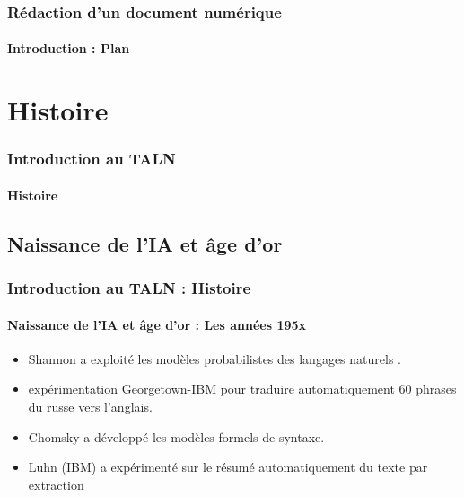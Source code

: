 \documentclass{beamer}
\begin{document}
\begin{frame}
\frametitle{Rédaction d'un document numérique}
\framesubtitle{Introduction : Plan}

\begin{multicols}{2}
\tableofcontents
\end{multicols}
\end{frame}

\section{Histoire}

\begin{frame}
\frametitle{Introduction au TALN}
\framesubtitle{Histoire}


\end{frame}

\subsection{Naissance de l'IA et âge d'or}

\begin{frame}
\frametitle{Introduction au TALN : Histoire}
\framesubtitle{Naissance de l'IA et âge d'or : Les années 195x}

\begin{itemize}
	\item {} Shannon a exploité les modèles probabilistes des langages naturels \cite{1951-shannon}.
	\item {} expérimentation Georgetown-IBM pour traduire automatiquement 60 phrases du russe vers l'anglais.
	\item {} Chomsky a développé les modèles formels de syntaxe.
	\item {} Luhn (IBM) a expérimenté sur le résumé automatiquement du texte par extraction \cite{1958-luhn}
\end{itemize}

\end{frame}
\end{document}
